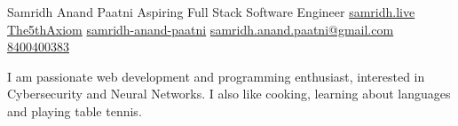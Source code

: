 \documentclass[]{plushcv}
\begin{document}
%
%

\namesection
{Samridh}
{Anand Paatni}
{Aspiring Full Stack Software Engineer}
{
    \contactline
    {\href{https://www.samridh.live}{samridh.live}}
    {\href{https://www.github.com/The5thAxiom}{The5thAxiom}}
    {\href{https://www.linkedin.com/in/samridh-anand-paatni-57a045215/}{samridh-anand-paatni}}
    {\href{mailto:samridh.anand.paatni@gmail.com}{samridh.anand.paatni@gmail.com}}
    {\href{tel:+918400400383}{8400400383}}}

\vspace{1em}
I am passionate web development and programming enthusiast, interested in
Cybersecurity and Neural Networks. I also like cooking, learning about languages and playing table tennis.

%
%
\end{document}
